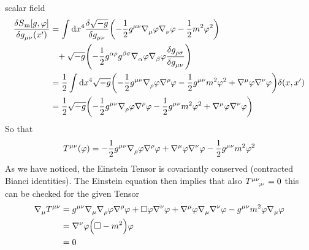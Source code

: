 scalar field
\begin{equation}
\begin{split}
\frac{\delta
S\textsubscript{m}[g,\varphi]}{\delta \tensor{g}{_\mu_\nu}\left(x'\right)}
&=\int \dif x^4 \frac{\delta\sqrt{-g}}{\delta
\tensor{g}{_\mu_\nu}}\left(-\frac{1}{2}\tensor{g}{^\mu^\nu}
\tensor{\nabla}{_\mu}\varphi\tensor{\nabla}{_\nu}\varphi-\frac{1}{2}m^2\varphi^2\right)\\
&\phantom{=}+
\sqrt{-g}\left(-\frac{1}{2}\tensor{g}{^\alpha^\rho}\tensor{g}{^\beta^\sigma} \tensor{\nabla}{_\alpha}\varphi\tensor{\nabla}{_\beta}\varphi\frac{\delta
\tensor{g}{_\rho_\sigma}}{\delta \tensor{g}{_\mu_\nu}}\right)\\
&=\frac{1}{2}\int \dif x^4
\sqrt{-g}\left(-\frac{1}{2}\tensor{g}{^\mu^\nu}\tensor{\nabla}{_\rho}\varphi\tensor{\nabla}{^\rho}\varphi-\frac{1}{2}\tensor{g}{^\mu^\nu}m^2\varphi^2
+\tensor{\nabla}{^\mu}\varphi\tensor{\nabla}{^\nu}\varphi\right)\delta(x,x')\\
&=\frac{1}{2}\sqrt{-g}\left(-\frac{1}{2}\tensor{g}{^\mu^\nu}\tensor{\nabla}{_\rho}\varphi\tensor{\nabla}{^\rho}\varphi-\frac{1}{2}\tensor{g}{^\mu^\nu}m^2\varphi^2
+\tensor{\nabla}{^\mu}\varphi\tensor{\nabla}{^\nu}\varphi\right)
\end{split}
\end{equation}
So that
\begin{equation}
\tensor{T}{^\mu^\nu}(\varphi)
=-\frac{1}{2}\tensor{g}{^\mu^\nu}\tensor{\nabla}{_\rho}\varphi\tensor{\nabla}{^\rho}\varphi
+\tensor{\nabla}{^\mu}\varphi\tensor{\nabla}{^\nu}\varphi
-\frac{1}{2}\tensor{g}{^\mu^\nu}m^2\varphi^2
\end{equation}
As we have noticed, the Einstein Tensor is covariantly conserved (contracted
Bianci identities). The Einstein equation then implies that also
$\tensor{T}{^\mu^\nu_{;\nu}}=0$ this can be checked for the given Tensor
\begin{equation}
\begin{split}
\tensor{\nabla}{_\mu}\tensor{T}{^\mu^\nu}
&=\tensor{g}{^\mu^\nu}\tensor{\nabla}{_\mu}\tensor{\nabla}{_\rho}\varphi\tensor{\nabla}{^\rho}\varphi+\square\varphi\tensor{\nabla}{^\nu}\varphi+\tensor{\nabla}{^\mu}\varphi\tensor{\nabla}{_\mu}\tensor{\nabla}{^\nu}\varphi
-\tensor{g}{^\mu^\nu}m^2\varphi\tensor{\nabla}{_\mu}\varphi\\
&=\tensor{\nabla}{^\nu}\varphi\left(\square-m^2\right)\varphi\\
&=0
\end{split}
\end{equation}
